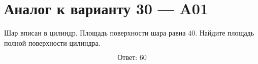 \documentclass[12pt,a4paper]{article}
\begin{document}
\section*{Аналог к варианту 30 — A01}

Шар вписан в цилиндр. Площадь поверхности шара равна \(40\). Найдите площадь полной поверхности цилиндра.

\begin{center}
\end{center}

\[
\boxed{\text{Ответ: }60}
\]
\end{document}
